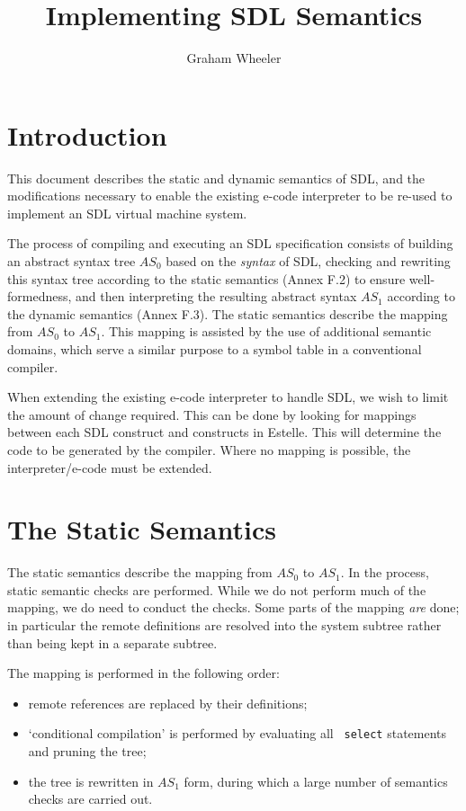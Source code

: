 

\title{Implementing SDL Semantics}
\author{Graham Wheeler}

\maketitle

\section{Introduction}

This document describes the static and dynamic semantics of SDL,
and the modifications necessary to enable the
existing e-code interpreter to be re-used to implement an SDL virtual
machine system.

The process of compiling and executing
an SDL specification consists of building an
abstract syntax tree $AS_0$ based on the {\em syntax} of SDL, checking
and rewriting this syntax tree according to the static semantics
(Annex F.2) to ensure well-formedness, and then interpreting the
resulting abstract syntax $AS_1$ according to the
dynamic semantics (Annex F.3).
The static semantics describe the mapping from $AS_0$ to $AS_1$. 
This mapping is assisted by the use of additional semantic domains, which
serve a similar purpose to a symbol table in a conventional compiler.

When extending the existing e-code interpreter to handle SDL,
we wish to limit the amount of change required.
This can be done by looking for mappings between each SDL
construct and constructs in Estelle. This will determine the code
to be generated by the compiler. Where no mapping is possible, the
interpreter/e-code must be extended.

\section{The Static Semantics}

The static semantics describe the mapping from $AS_0$ to $AS_1$. In
the process, static semantic checks are performed. While we do not 
perform much of the mapping, we do need to conduct the checks.
Some parts of the mapping {\em are} done; in particular the remote
definitions are resolved into the system subtree rather than being
kept in a separate subtree.

The mapping is performed in the following order:

\begin{itemize}
\item remote references are replaced by their definitions;
\item `conditional compilation' is performed by evaluating all {\tt
select} statements and pruning the tree;
\item the tree is rewritten in $AS_1$ form, during which
a large number of semantics checks are carried out.
\end{itemize}

